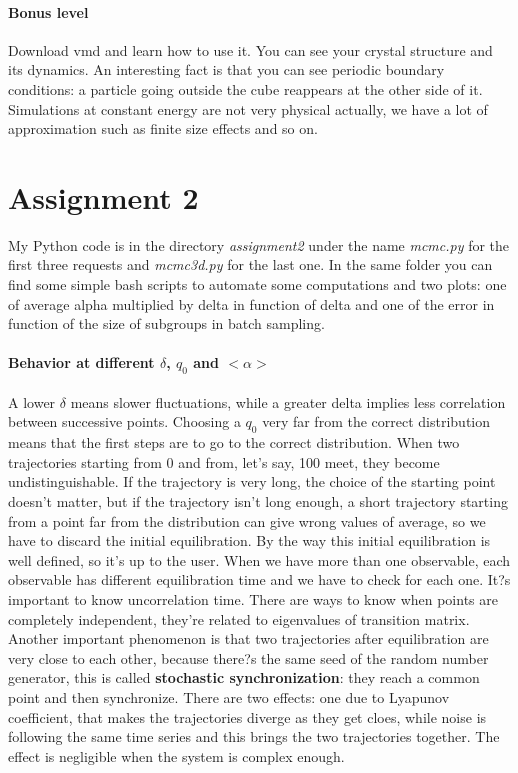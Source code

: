 \documentclass[a4paper, italian, openany]{book}
\begin{document}
\paragraph{Bonus level}

Download vmd and learn how to use it. You can see your crystal structure and its dynamics.\newline
An interesting fact is that you can see periodic boundary conditions: a particle going outside the cube reappears at the other side of it.\newline
Simulations at constant energy are not very physical actually, we have a lot of approximation such as finite size effects and so on.

\section{Assignment 2}

My Python code is in the directory \textit{assignment2} under the name \textit{mcmc.py} for the first three requests and \textit{mcmc3d.py} for the last one. In the same folder you can find some simple bash scripts to automate some computations and two plots: one of average alpha multiplied by delta in function of delta and one of the error in function of the size of subgroups in batch sampling.

\paragraph{Behavior at different $\delta$, $q_0$ and $<\alpha>$}

A lower $\delta$ means slower fluctuations, while a greater delta implies less correlation between successive points.\newline
Choosing a $q_0$ very far from the correct distribution means that the first steps are to go to the correct distribution. When two trajectories starting from 0 and from, let's say, 100 meet, they become undistinguishable. If the trajectory is very long, the choice of the starting point doesn't matter, but if the trajectory isn't long enough, a short trajectory starting from a point far from the distribution can give wrong values of average, so we have to discard the initial equilibration. By the way this initial equilibration is well defined, so it's up to the user.\newline
When we have more than one observable, each observable has different equilibration time and we have to check for each one. It?s important to know uncorrelation time. There are ways to know when points are completely independent, they're related to eigenvalues of transition matrix.\newline
Another important phenomenon is that two trajectories after equilibration are very close to each other, because there?s the same seed of the random number generator, this is called \textbf{stochastic synchronization}: they reach a common point and then synchronize. There are two effects: one due to Lyapunov coefficient, that makes the trajectories diverge as they get cloes, while noise is following the same time series and this brings the two trajectories together. The effect is negligible when the system is complex enough.
\end{document}
